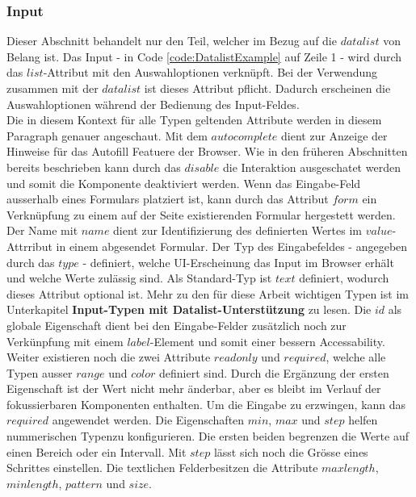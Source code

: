 \subsubsection{Input}
Dieser Abschnitt behandelt nur den Teil, welcher im Bezug auf die $datalist$ von Belang ist.
Das Input - in Code \ref{code:DatalistExample} auf Zeile 1 - wird durch das $list$-Attribut mit den Auswahloptionen verknüpft.
Bei der Verwendung zusammen mit der $datalist$ ist dieses Attribut pflicht.
Dadurch erscheinen die Auswahloptionen während der Bedienung des Input-Feldes. 
\\
Die in diesem Kontext für alle Typen geltenden Attribute werden in diesem Paragraph genauer angeschaut.
Mit dem $autocomplete$ dient zur Anzeige der Hinweise für das Autofill Featuere der Browser.
Wie in den früheren Abschnitten bereits beschrieben kann durch das $disable$ die Interaktion ausgeschatet werden und somit die Komponente deaktiviert werden.
Wenn das Eingabe-Feld ausserhalb eines Formulars platziert ist, kann durch das Attribut $form$ ein Verknüpfung zu einem auf der Seite existierenden Formular hergestett werden.
Der Name mit $name$ dient zur Identifizierung des definierten Wertes im $value$-Attrribut in einem abgesendet Formular.
Der Typ des Eingabefeldes - angegeben durch das $type$ - definiert, welche UI-Erscheinung das Input im Browser erhält und welche Werte zulässig sind.
Als Standard-Typ ist $text$ definiert, wodurch dieses Attribut optional ist.
Mehr zu den für diese Arbeit wichtigen Typen ist im Unterkapitel \textbf{Input-Typen mit Datalist-Unterstützung} zu lesen.
Die $id$ als globale Eigenschaft dient bei den Eingabe-Felder zusätzlich noch zur Verkünpfung mit einem $label$-Element und somit einer bessern Accessability.
\\
Weiter existieren noch die zwei Attribute $readonly$ und $required$, welche alle Typen ausser $range$ und $color$ definiert sind.
Durch die Ergänzung der ersten Eigenschaft ist der Wert nicht mehr änderbar, aber es bleibt im Verlauf der fokussierbaren Komponenten enthalten.
Um die Eingabe zu erzwingen, kann das $required$ angewendet werden.
Die Eigenschaften $min$, $max$ und $step$ helfen nummerischen Typen\footnotemark zu konfigurieren.
Die ersten beiden begrenzen die Werte auf einen Bereich oder ein Intervall.
Mit $step$ lässt sich noch die Grösse eines Schrittes einstellen.
Die textlichen Felder\footnotemark besitzen die Attribute $maxlength$, $minlength$, $pattern$ und $size$.
